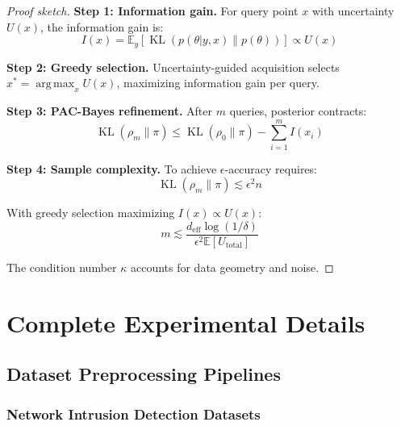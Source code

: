 \documentclass[12pt,a4paper]{article}
\theoremstyle{definition}
\DeclareMathOperator{\KL}{KL}
\DeclareMathOperator*{\argmax}{arg\,max}
\begin{document}
\begin{proof}[Proof sketch]
\textbf{Step 1: Information gain.}
For query point $x$ with uncertainty $U(x)$, the information gain is:
\begin{equation}
I(x) = \mathbb{E}_{y}[\KL(p(\theta|y,x)\|p(\theta))] \propto U(x)
\end{equation}

\textbf{Step 2: Greedy selection.}
Uncertainty-guided acquisition selects $x^* = \argmax_x U(x)$, maximizing information gain per query.

\textbf{Step 3: PAC-Bayes refinement.}
After $m$ queries, posterior contracts:
\begin{equation}
\KL(\rho_m\|\pi) \leq \KL(\rho_0\|\pi) - \sum_{i=1}^m I(x_i)
\end{equation}

\textbf{Step 4: Sample complexity.}
To achieve $\epsilon$-accuracy requires:
\begin{equation}
\KL(\rho_m\|\pi) \lesssim \epsilon^2 n
\end{equation}

With greedy selection maximizing $I(x) \propto U(x)$:
\begin{equation}
m \lesssim \frac{d_{\text{eff}}\log(1/\delta)}{\epsilon^2 \mathbb{E}[U_{\text{total}}]}
\end{equation}

The condition number $\kappa$ accounts for data geometry and noise.
\end{proof}

\section{Complete Experimental Details}
\label{app:experimental_details}

\subsection{Dataset Preprocessing Pipelines}

\subsubsection{Network Intrusion Detection Datasets}
\end{document}
